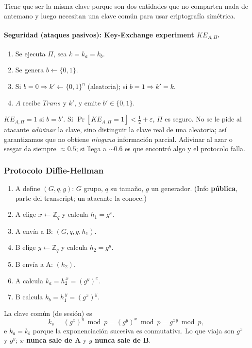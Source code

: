 \documentclass[../main.tex]{subfiles}
\begin{document}
Tiene que ser la misma clave porque son dos entidades que no comparten nada de
antemano y luego necesitan una clave común para usar criptografía simétrica.

\paragraph{Seguridad (ataques pasivos): Key-Exchange experiment $KE_{A,\Pi}$.}
\begin{enumerate}[leftmargin=1.6em,nosep]
  \item Se ejecuta $\Pi$, sea $k=k_a=k_b$.
  \item Se genera $b\leftarrow\{0,1\}$.
  \item Si $b=0 \Rightarrow k'\leftarrow\{0,1\}^n$ (aleatoria); si $b=1 \Rightarrow k'=k$.
  \item $A$ recibe $Trans$ y $k'$, y emite $b'\in\{0,1\}$.
\end{enumerate}
$KE_{A,\Pi}=1$ si $b=b'$. Si $\Pr[KE_{A,\Pi}=1]<\tfrac12+\varepsilon$, $\Pi$ es
seguro. No se le pide al atacante \emph{adivinar} la clave, sino distinguir la
clave real de una aleatoria; así garantizamos que no obtiene \emph{ninguna}
información parcial. Adivinar al azar o sesgar da siempre $\approx 0.5$; si llega
a $\sim0.6$ es que encontró algo y el protocolo falla.

\subsubsection{Protocolo Diffie-Hellman}

\begin{enumerate}[leftmargin=1.6em]
  \item A define $(G,q,g)$: $G$ grupo, $q$ su tamaño, $g$ un generador. (Info
  \textbf{pública}, parte del transcript; un atacante la conoce.)
  \item A elige $x\leftarrow\mathbb{Z}_q$ y calcula $h_1=g^x$.
  \item A envía a B: $(G,q,g,h_1)$.
  \item B elige $y\leftarrow\mathbb{Z}_q$ y calcula $h_2=g^y$.
  \item B envía a A: $(h_2)$.
  \item A calcula $k_a=h_2^{\,x}=(g^y)^x$.
  \item B calcula $k_b=h_1^{\,y}=(g^x)^y$.
\end{enumerate}
La clave común (de sesión) es
\[ k_s=(g^x)^y \bmod p=(g^y)^x \bmod p=g^{xy}\bmod p, \]
e $k_a=k_b$ porque la exponenciación sucesiva es conmutativa. Lo que viaja son
$g^x$ y $g^y$; \textbf{$x$ nunca sale de A} y \textbf{$y$ nunca sale de B}.
\end{document}
